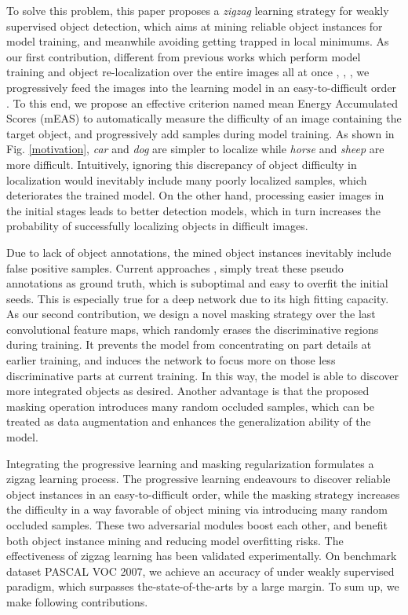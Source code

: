 \documentclass[10pt,twocolumn,letterpaper]{article}
\begin{document}
To solve this problem, this paper proposes a \emph{zigzag} learning strategy for weakly supervised object detection, which aims at mining reliable object instances for model training, and meanwhile avoiding getting trapped in local minimums. As our first contribution, different from previous works which perform model training and object re-localization over the entire images all at once \cite{Li_2016_CVPR}, \cite{Tang_2017_CVPR}, \cite{jie2017deep}, we progressively feed the images into the learning model in an easy-to-difficult order \cite{kumar2010self}. To this end, we propose an effective criterion named mean Energy Accumulated Scores (mEAS) to automatically measure the difficulty of an image containing the target object, and progressively add samples during model training. As shown in Fig. \ref{motivation}, \textit{car} and \textit{dog} are simpler to localize while \textit{horse} and \textit{sheep} are more difficult. Intuitively, ignoring this discrepancy of object difficulty in localization would inevitably include many poorly localized samples, which deteriorates the trained model. On the other hand, processing easier images in the initial stages leads to better detection models, which in turn increases the probability of successfully localizing objects in difficult images.


Due to lack of object annotations, the mined object instances inevitably include false positive samples. Current approaches \cite{Li_2016_CVPR}, \cite{Tang_2017_CVPR} simply treat these pseudo annotations as ground truth, which is suboptimal and easy to overfit the initial seeds. This is especially true for a deep network due to its high fitting capacity. As our second contribution, we design a novel masking strategy over the last convolutional feature maps, which randomly erases the discriminative regions during training. It prevents the model from concentrating on part details at earlier training, and induces the network to focus more on those less discriminative parts at current  training. In this way, the model is able to discover more integrated objects as desired. Another advantage is that the proposed masking operation introduces many random occluded samples, which can be treated as data augmentation and enhances the generalization ability of the model.






Integrating the progressive learning and masking regularization formulates a zigzag learning process. The progressive learning endeavours to discover reliable object instances in an easy-to-difficult order, while the masking strategy increases the difficulty in a way favorable of object mining via introducing many random occluded samples. These two adversarial modules boost each other, and benefit both object instance mining and reducing model overfitting risks. The effectiveness of zigzag learning has been validated experimentally. On benchmark dataset PASCAL VOC 2007, we achieve an accuracy of  under weakly supervised paradigm, which surpasses the-state-of-the-arts by a large margin.
To sum up, we make following contributions.
\end{document}
